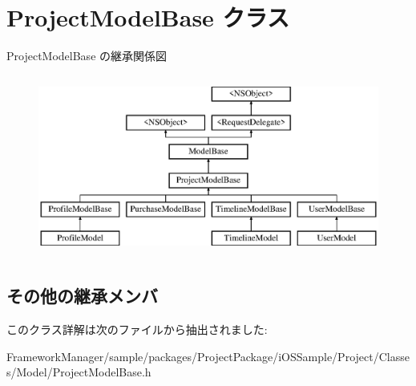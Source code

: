 \hypertarget{interface_project_model_base}{}\section{Project\+Model\+Base クラス}
\label{interface_project_model_base}
Project\+Model\+Base の継承関係図\begin{figure}[H]
\begin{center}
\leavevmode
\includegraphics[height=6.000000cm]{interface_project_model_base}
\end{center}
\end{figure}
\subsection*{その他の継承メンバ}


このクラス詳解は次のファイルから抽出されました\+:\begin{DoxyCompactItemize}
\item 
Framework\+Manager/sample/packages/\+Project\+Package/i\+O\+S\+Sample/\+Project/\+Classes/\+Model/Project\+Model\+Base.\+h\end{DoxyCompactItemize}

